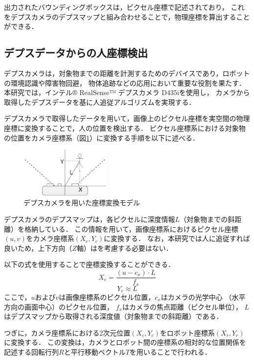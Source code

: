 出力されたバウンディングボックスは，ピクセル座標で記述されており，
これをデプスカメラのデプスマップと組み合わせることで，物理座標を算出することができる．

\subsection{デプスデータからの人座標検出}
デプスカメラは，対象物までの距離を計測するためのデバイスであり，ロボットの環境認識や障害物回避，
物体追跡などの応用において重要な役割を果たす．
本研究では，インテル® RealSense™ デプスカメラ D435iを使用し，
カメラから取得したデプスデータを基に人追従アルゴリズムを実現する．

デプスカメラで取得したデータを用いて，画像上のピクセル座標を実空間の物理座標に変換することで，人の位置を検出する．
ピクセル座標系における対象物の位置をカメラ座標系（図\ref{fig:coordinate_conversion}）に変換する手順を以下に述べる．

\begin{figure}[h]
    \centering
    \includegraphics[width=0.4\textwidth]{figure/rialsens_man.pdf}
    \caption{デプスカメラを用いた座標変換モデル}
    \label{fig:coordinate_conversion}
\end{figure}

デプスカメラのデプスマップは，各ピクセルに深度情報$L$（対象物までの斜距離）を格納している．
この情報を用いて，画像座標系におけるピクセル座標$(u, v)$をカメラ座標系$(X_c, Y_c)$に変換する．
なお，本研究では人に追従すれば良いため，上下方向（$Z$軸）はを考慮する必要はない．


以下の式を使用することで座標変換することができる．
\begin{equation}
    X_c = \frac{(u - c_x) \cdot L}{f_x}
    \label{eq:xc}
\end{equation}
\begin{equation}
    Y_c \approx L
    \label{eq:yc}
\end{equation}
ここで，$u$および$v$は画像座標系のピクセル位置，$c_x$はカメラの光学中心
（水平方向の画面中心）のピクセル位置，
$f_x$はカメラの焦点距離（ピクセル単位），
$L$はデプスマップから取得される深度値（対象物までの斜距離）である．

つぎに，カメラ座標系における2次元位置$(X_c, Y_c)$をロボット座標系$(X_r, Y_r)$に変換する．
この変換は，カメラとロボット間の座標系の相対的な位置関係を記述する回転行列$R$と平行移動ベクトル$T$を用いることで行われる．

